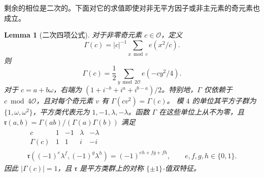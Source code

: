 \documentclass[11pt,a4paper]{article}
\numberwithin{equation}{section}
\numberwithin{figure}{section}
\newtheorem{lemma}[theorem]{Lemma}
\theoremstyle{definition}
\theoremstyle{remark}
\begin{document}
剩余的相位是二次的。下面对它的求值即使对非无平方因子或非主元素的奇元素也成立。

\begin{lemma}[二次四项公式]\label{lem:quadratic-four-term}
对于非零奇元素 $c\in\mathcal O$，定义
\[
 \Gamma(c)=|c|^{-1}\sum_{x\bmod c}e(x^2/c).
\]
则
\begin{equation}\label{eq:quadratic-four-term}
 \Gamma(c)=\frac12\sum_{y\bmod2\mathcal O}e(-cy^2/4).
\end{equation}
对于 $c=a+b\omega$，右端为
$(1+i^{-b}+i^a+i^{b-a})/2$。特别地，$\Gamma$ 仅依赖于
$c\bmod4\mathcal O$，且对每个奇元素 $v$ 有 $\Gamma(cv^2)=\Gamma(c)$。
模 $4$ 的单位其平方子群为 $\{1,\omega,\omega^2\}$，平方类代表元为
$1,-1,\lambda,-\lambda$。函数 $\Gamma$ 在这些单位上从不为零，且
$\mathfrak r(a,b)=\Gamma(ab)/(\Gamma(a)\Gamma(b))$ 满足
\begin{equation}\label{eq:reciprocity-four-class}
 \begin{gathered}
 \begin{array}{c|rrrr}
  c&1&-1&\lambda&-\lambda\\ \hline
  \Gamma(c)&1&1&i&-i
 \end{array}\\
 \mathfrak r((-1)^e\lambda^f,(-1)^g\lambda^h)
       =(-1)^{eh+fg+fh},\qquad e,f,g,h\in\{0,1\}.
 \end{gathered}
\end{equation}
因此 $|\Gamma(c)|=1$，且 $\mathfrak r$ 是平方类群上的对称
$\{\pm1\}$-值双特征。
\end{lemma}
\end{document}
